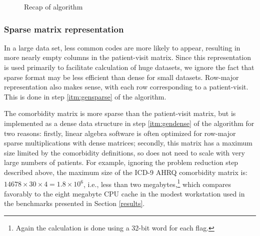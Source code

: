 \documentclass[article]{jss}
\begin{document}
\begin{figure}[h]
\centering
\setlength{\fboxsep}{1em}
\setlength{\fboxrule}{1pt}
%
\caption{Recap of algorithm}
\label{algorecap}
\end{figure}

\hypertarget{sparse-matrix-representation}{%
\subsubsection{Sparse matrix
representation}\label{sparse-matrix-representation}}

In a large data set, less common codes are more likely to appear,
resulting in more nearly empty columns in the patient-visit matrix.
Since this representation is used primarily to facilitate calculation of
huge datasets, we ignore the fact that sparse format may be less
efficient than dense for small datasets. Row-major representation also
makes sense, with each row corresponding to a patient-visit. This is
done in step \ref{itm:gensparse} of the algorithm.

The comorbidity matrix is more sparse than the patient-visit matrix, but
is implemented as a dense data structure in step \ref{itm:gendense} of
the algorithm for two reasons: firstly, linear algebra software is often
optimized for row-major sparse multiplications with dense matrices;
secondly, this matrix has a maximum size limited by the comorbidity
definitions, so does not need to scale with very large numbers of
patients. For example, ignoring the problem reduction step described
above, the maximum size of the ICD-9 AHRQ comorbidity matrix is:
\(14678 \times 30 \times 4 = 1.8 \times 10^6\), i.e., less than two
megabytes,\footnote{Again the calculation is done using a 32-bit word
  for each flag.} which compares favorably to the eight megabyte CPU
cache in the modest workstation used in the benchmarks presented in
Section \ref{results}.
\end{document}
